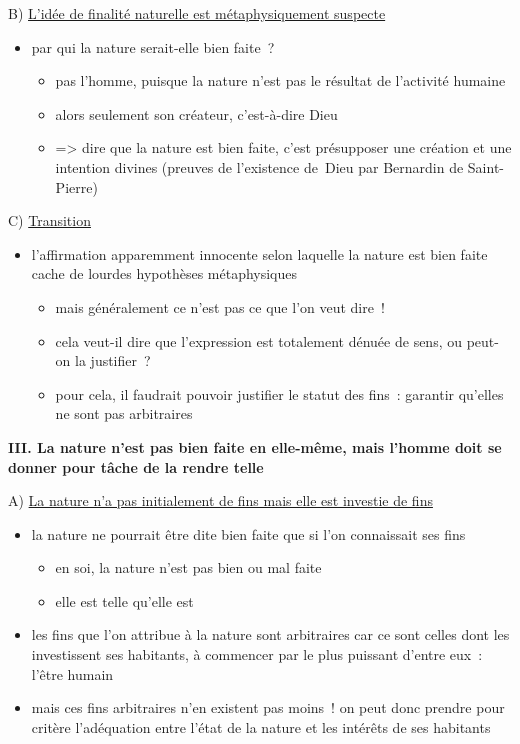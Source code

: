 \documentclass[a4paper,12pt]{report}
\begin{document}
\medskip

B) \uline{L'idée de finalité naturelle est métaphysiquement suspecte}
\begin{itemize}
\item par qui la nature serait-elle bien faite ?
\begin{itemize}
\item pas l'homme, puisque la nature n'est pas le résultat de l'activité
humaine
\item alors seulement son créateur, c'est-à-dire Dieu
\item => dire que la nature est bien faite, c'est présupposer une création
et une intention divines (preuves de l'existence de Dieu par
Bernardin de Saint-Pierre)
\end{itemize}
\end{itemize}

\medskip

C) \uline{Transition}
\begin{itemize}
\item l'affirmation apparemment innocente selon laquelle la nature est bien
faite cache de lourdes hypothèses métaphysiques
\begin{itemize}
\item mais généralement ce n'est pas ce que l'on veut dire !
\item cela veut-il dire que l'expression est totalement dénuée de sens, ou
peut-on la justifier ?
\item pour cela, il faudrait pouvoir justifier le statut des fins :
garantir qu'elles ne sont pas arbitraires
\end{itemize}
\end{itemize}

\bigskip


\textbf{III. La nature n'est pas bien faite en elle-même, mais l'homme doit se
donner pour tâche de la rendre telle}

\medskip

A) \uline{La nature n'a pas initialement de fins mais elle est investie de fins}
\begin{itemize}
\item la nature ne pourrait être dite bien faite que si l'on connaissait ses
fins
\begin{itemize}
\item en soi, la nature n'est pas bien ou mal faite
\item elle est telle qu'elle est
\end{itemize}
\item les fins que l'on attribue à la nature sont arbitraires car ce sont
celles dont les investissent ses habitants, à commencer par le plus
puissant d'entre eux : l'être humain
\item mais ces fins arbitraires n'en existent pas moins ! on peut donc
prendre pour critère l'adéquation entre l'état de la nature et les
intérêts de ses habitants
\end{itemize}
\end{document}
